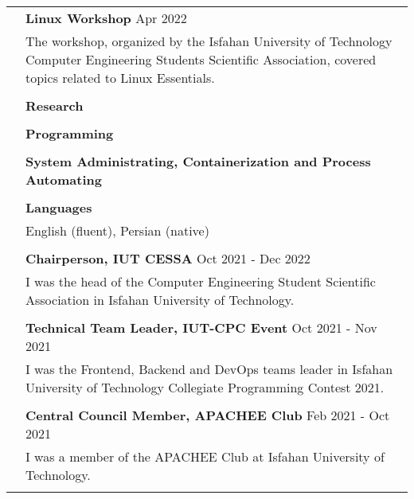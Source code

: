 \documentclass[letterpaper, 11pt]{article}
\begin{document}
\begin{longtable}{p{1.3in}p{4.8in}}
& \textbf{Linux Workshop} \hfill  Apr 2022 \\
& The workshop, organized by the Isfahan University of Technology Computer Engineering Students Scientific Association, covered topics related to Linux Essentials. \\
& \\


{\color{MidnightBlue}{Skills}} 
& \textbf{Research}\\
& \\

& \textbf{Programming}\\
& \\

& \textbf{System Administrating, Containerization and Process Automating}\\
& \\

& \textbf{Languages} \\
& English (fluent), Persian (native) \\
& \\


\color{MidnightBlue}{Volunteer Activities}
& \textbf{Chairperson, IUT CESSA} \hfill Oct 2021 - Dec 2022 \\
& I was the head of the Computer Engineering Student Scientific Association in Isfahan University of Technology. \\
& \\

& \textbf{Technical Team Leader, IUT-CPC Event} \hfill Oct 2021 - Nov 2021 \\
& I was the Frontend, Backend and DevOps teams leader in Isfahan University of Technology Collegiate Programming Contest 2021. \\
& \\

& \textbf{Central Council Member, APACHEE Club} \hfill Feb 2021 - Oct 2021 \\
& I was a member of the APACHEE Club at Isfahan University of Technology. \\
& \\


\end{longtable}
\end{document}

